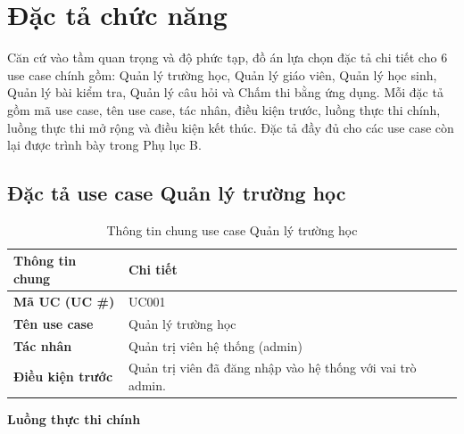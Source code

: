 \section{Đặc tả chức năng}
\label{section:2.3}

Căn cứ vào tầm quan trọng và độ phức tạp, đồ án lựa chọn đặc tả chi tiết cho 6 use case chính gồm: Quản lý trường học, Quản lý giáo viên, Quản lý học sinh, Quản lý bài kiểm tra, Quản lý câu hỏi và Chấm thi bằng ứng dụng. Mỗi đặc tả gồm mã use case, tên use case, tác nhân, điều kiện trước, luồng thực thi chính, luồng thực thi mở rộng và điều kiện kết thúc. Đặc tả đầy đủ cho các use case còn lại được trình bày trong Phụ lục B.

\subsection{Đặc tả use case Quản lý trường học}
\label{subsection:2.3.1}

\begin{table}[htbp]
\centering
\begin{tabular}{|p{4cm}|p{10cm}|}
\hline
\textbf{Thông tin chung} & \textbf{Chi tiết} \\ \hline
\textbf{Mã UC (UC \#)} & UC001 \\ \hline
\textbf{Tên use case} & Quản lý trường học \\ \hline
\textbf{Tác nhân} & Quản trị viên hệ thống (admin) \\ \hline
\textbf{Điều kiện trước} & Quản trị viên đã đăng nhập vào hệ thống với vai trò admin. \\ \hline
\end{tabular}
\caption{Thông tin chung use case Quản lý trường học}
\label{table:2.3.1_info}
\end{table}

\noindent\textbf{Luồng thực thi chính}

